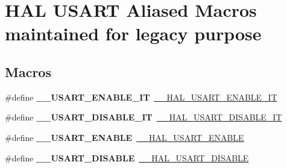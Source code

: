 \hypertarget{group___h_a_l___u_s_a_r_t___aliased___macros}{}\section{H\+AL U\+S\+A\+RT Aliased Macros maintained for legacy purpose}
\label{group___h_a_l___u_s_a_r_t___aliased___macros}
\subsection*{Macros}
\begin{DoxyCompactItemize}
\item 
\mbox{\label{group___h_a_l___u_s_a_r_t___aliased___macros_gab99081ba6bb70f397ab2def3f644c3c1}} 
\#define {\bfseries \+\_\+\+\_\+\+U\+S\+A\+R\+T\+\_\+\+E\+N\+A\+B\+L\+E\+\_\+\+IT}~\hyperlink{group___u_s_a_r_t___exported___macros_ga2258521c741456b4254064958ca7ef51}{\+\_\+\+\_\+\+H\+A\+L\+\_\+\+U\+S\+A\+R\+T\+\_\+\+E\+N\+A\+B\+L\+E\+\_\+\+IT}
\item 
\mbox{\label{group___h_a_l___u_s_a_r_t___aliased___macros_ga12ae7c59b7d95f0f8606fca7bba57db8}} 
\#define {\bfseries \+\_\+\+\_\+\+U\+S\+A\+R\+T\+\_\+\+D\+I\+S\+A\+B\+L\+E\+\_\+\+IT}~\hyperlink{group___u_s_a_r_t___exported___macros_gad1cd8973d175b1b031f21aff3101f5fd}{\+\_\+\+\_\+\+H\+A\+L\+\_\+\+U\+S\+A\+R\+T\+\_\+\+D\+I\+S\+A\+B\+L\+E\+\_\+\+IT}
\item 
\mbox{\label{group___h_a_l___u_s_a_r_t___aliased___macros_gae03c01e0ee50608e887842bacbf5b361}} 
\#define {\bfseries \+\_\+\+\_\+\+U\+S\+A\+R\+T\+\_\+\+E\+N\+A\+B\+LE}~\hyperlink{group___u_s_a_r_t___exported___macros_ga60e106d6d610ea5fa1ab2d5ca079a8cf}{\+\_\+\+\_\+\+H\+A\+L\+\_\+\+U\+S\+A\+R\+T\+\_\+\+E\+N\+A\+B\+LE}
\item 
\mbox{\label{group___h_a_l___u_s_a_r_t___aliased___macros_gac894c090835b348469f36bfed6e78fbd}} 
\#define {\bfseries \+\_\+\+\_\+\+U\+S\+A\+R\+T\+\_\+\+D\+I\+S\+A\+B\+LE}~\hyperlink{group___u_s_a_r_t___exported___macros_ga8cc760b7a382db42655d21a5edbfc227}{\+\_\+\+\_\+\+H\+A\+L\+\_\+\+U\+S\+A\+R\+T\+\_\+\+D\+I\+S\+A\+B\+LE}

\end{DoxyCompactItemize}
